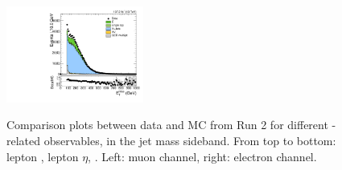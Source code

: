 \begin{figure}[htbp]
  \includegraphics[width=0.4\textwidth]{fig/analysis/SB_b1_e_allP_allC_allE_Run2_met_pt.pdf}\\
  \caption{
    Comparison plots between data and MC from Run 2 for different \Wlep-related observables, in the jet mass sideband.
    From top to bottom: lepton \pt, lepton $\eta$, \Etmiss.
    Left: muon channel, right: electron channel.
  }
  \label{fig:SB_controlPlotsRun2_1}
\end{figure}


